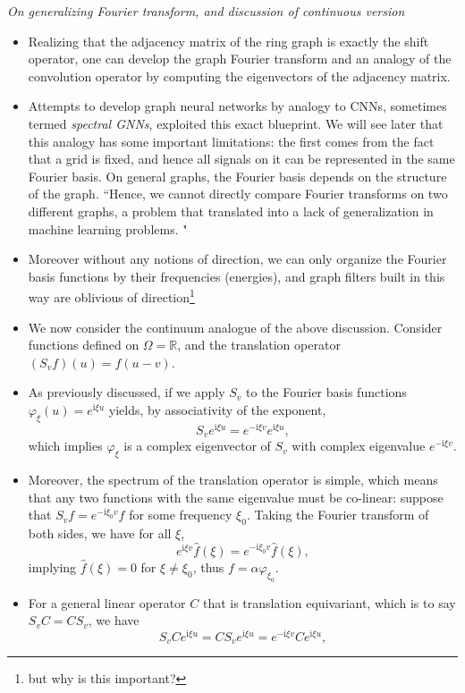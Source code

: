 \documentclass[12pt]{article}
\numberwithin{equation}{section}
\theoremstyle{definition}
\newcommand{		\rmi		}	{	\textrm{i}					}
\newcommand{		\n		}	{	\noindent					} %
\newcommand{		\1		}	{	\bm{1}					}%
\begin{document}
\n\hrulefill 
\emph{ On generalizing Fourier transform, and discussion of continuous version }
\hrulefill

\begin{itemize}
\item Realizing that the adjacency matrix of the ring graph is exactly the shift operator, one can develop the graph Fourier transform and an analogy of the convolution operator by computing the eigenvectors of the adjacency matrix. 
\item Attempts to develop graph neural networks by analogy to CNNs, sometimes termed \emph{spectral GNNs}, exploited this exact blueprint. We will see later that this analogy has some important limitations: the first comes from the fact that a grid is fixed, and hence all signals on it can be represented in the same Fourier basis. On general graphs, the Fourier basis depends on the structure of the graph. ``Hence, we cannot directly compare Fourier transforms on two different graphs, a problem that translated into a lack of generalization in machine learning problems. "
\item Moreover without any notions of direction, we can only organize the Fourier basis functions by their frequencies (energies), and graph filters built in this way are oblivious of direction\footnote{but why is this important?}
\item We now consider the continuum analogue of the above discussion. Consider functions defined on $\Omega = \mathbb{R}$, and the translation operator $(S_v f ) (u) = f( u - v)$. 
\item As previously discussed, if we apply $S_v$ to the Fourier basis functions $\varphi_\xi(u) = e^{ \rmi \xi u } $ yields, by associativity of the exponent, 
$$
S_v e^{\rmi \xi u } = e^{- \rmi \xi v } e^{\rmi \xi u} ,
$$
which implies $\varphi_\xi $ is a complex eigenvector of $S_v$ with complex eigenvalue $e^{-\rmi \xi v}$. 
\item Moreover, the spectrum of the translation operator is simple, which means that any two functions with the same eigenvalue must be co-linear: suppose that $S_v f = e^{-\rmi \xi_0 v } f$ for some frequency $\xi_0$. Taking the Fourier transform of both sides, we have for all $\xi$,
$$
e^{\rmi \xi v } \hat{f}(\xi) = e^{- \rmi \xi_0 v} \hat{f}(\xi),
$$
implying $\hat{f}(\xi) = 0$ for $\xi \neq \xi_0$, thus $f = \alpha \varphi _{\xi_0}$. 
\item For a general linear operator $C$ that is translation equivariant, which is to say $S_v C = C S_v$, we have
$$
S_v C e^{\rmi \xi u} = CS_v e^{\rmi \xi u} = e^{-\rmi \xi v } C e^{\rmi \xi u} ,
$$
\end{itemize}
\end{document}
